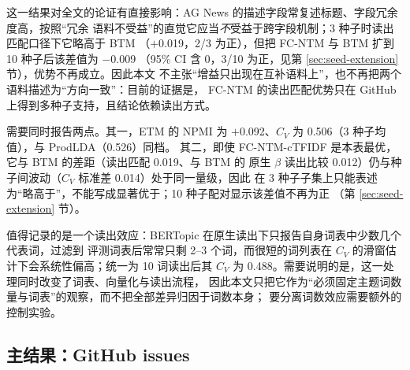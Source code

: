 \documentclass[11pt]{ctexart}
\newcommand{\fcntm}{FC-NTM}
\begin{document}
这一结果对全文的论证有直接影响：AG News 的描述字段常复述标题、字段冗余度高，按照“冗余
语料不受益”的直觉它应当\emph{不}受益于跨字段机制；3 种子时读出匹配口径下它略高于 BTM
（$+$0.019，2/3 为正），但把 \fcntm{} 与 BTM 扩到 10 种子后该差值为 $-$0.009
（95\% CI 含 0，3/10 为正，见第 \ref{sec:seed-extension} 节），优势不再成立。因此本文
不主张“增益只出现在互补语料上”，也不再把两个语料描述为“方向一致”：目前的证据是，
\fcntm{} 的读出匹配优势只在 GitHub 上得到多种子支持，且结论依赖读出方式。

需要同时报告两点。其一，ETM 的 NPMI 为 $+$0.092、$C_V$ 为 0.506（3 种子均值），与
ProdLDA（0.526）同档。
其二，即使 \fcntm{}-cTFIDF 是本表最优，它与 BTM 的差距（读出匹配 0.019、与 BTM 的
原生 $\beta$ 读出比较 0.012）仍与种子间波动（$C_V$ 标准差 0.014）处于同一量级，因此
在 3 种子子集上只能表述为“略高于”，不能写成显著优于；10 种子配对显示该差值不再为正
（第 \ref{sec:seed-extension} 节）。

值得记录的是一个读出效应：BERTopic 在原生读出下只报告自身词表中少数几个代表词，过滤到
评测词表后常常只剩 2--3 个词，而很短的词列表在 $C_V$ 的滑窗估计下会系统性偏高；统一为
10 词读出后其 $C_V$ 为 0.488。需要说明的是，这一处理同时改变了词表、向量化与读出流程，
因此本文只把它作为“必须固定主题词数量与词表”的观察，而不把全部差异归因于词数本身；
要分离词数效应需要额外的控制实验。

\subsection{主结果：GitHub issues}
\label{sec:main-github}
\end{document}
